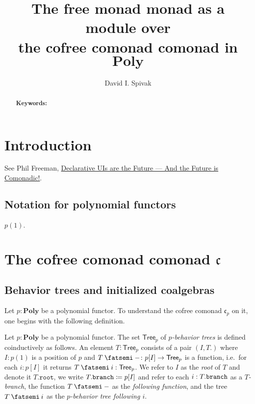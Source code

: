 \documentclass[11pt, one side, article]{memoir}
\theoremstyle{definition}
\theoremstyle{plain}
\newenvironment{definition}
  {\pushQED{\qed}\renewcommand{\qedsymbol}{$\lozenge$}\definitionx}
  {\popQED\enddefinitionx}
\newcommand{\Set}[1]{\mathsf{#1}}%
\newcommand{\Cat}[1]{\mathbf{#1}}%
\newcommand{\then}{\mathbin{\fatsemi}}
\newcommand{\tn}[1]{\textnormal{#1}}
\newcommand{\poly}{\Cat{Poly}}
\newcommand{\cofree}{\mathfrak{c}}
\newcommand{\tree}{\Set{Tree}}
\newcommand{\rt}{\texttt{root}}
\newcommand{\br}{\tn{\texttt{branch}}}
\begin{document}
\title{The free monad monad as a module over\\the cofree comonad comonad in $\poly$}

\author{David I. Spivak}

\date{\vspace{-.2in}}

\maketitle

\begin{abstract}


\smallskip

\noindent
\textbf{Keywords:} 
\end{abstract}


\chapter{Introduction}

See Phil Freeman, \href{https://functorial.com/the-future-is-comonadic/main.pdf}{Declarative UIs are the Future — And the Future is Comonadic!}.

\section{Notation for polynomial functors}

$p(1)$.

\chapter{The cofree comonad comonad $\cofree$}

\section{Behavior trees and initialized coalgebras}

Let $p:\poly$ be a polynomial functor. To understand the cofree comonad $\cofree_p$ on it, one begins with the following definition.

\begin{definition}
Let $p:\poly$ be a polynomial functor. The set $\tree_p$ of \emph{$p$-behavior trees} is defined coinductively as follows. An element $T:\tree_p$ consists of a pair $(I,T.)$ where $I:p(1)$ is a position of $p$ and $T\then -\colon p[I]\to\tree_p$ is a function, i.e.\ for each $i:p[I]$ it returns $T\then i:\tree_p$. 
We refer to $I$ as the \emph{root} of $T$ and denote it $T.\rt$, we write $T.\br\coloneqq p[I]$ and refer to each $i:T.\br$ as a \emph{$T$-branch}, the function $T\then-$ as the \emph{following function}, and the tree $T\then i$ as the \emph{$p$-behavior tree following $i$}.
\end{definition}
\end{document}
